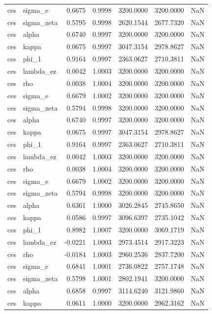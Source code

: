 \begin{tabular}{llrrrrl}
ces & sigma\_e & 0.6675 & 0.9998 & 3200.0000 & 3200.0000 & NaN \\
ces & sigma\_zeta & 0.5795 & 0.9998 & 2620.1544 & 2677.7320 & NaN \\
ces & alpha & 0.6740 & 0.9997 & 3200.0000 & 3200.0000 & NaN \\
ces & kappa & 0.0675 & 0.9997 & 3047.3154 & 2978.8627 & NaN \\
ces & phi\_1 & 0.9164 & 0.9997 & 2363.0627 & 2710.3811 & NaN \\
ces & lambda\_ez & 0.0042 & 1.0003 & 3200.0000 & 3200.0000 & NaN \\
ces & rho & 0.0038 & 1.0004 & 3200.0000 & 3200.0000 & NaN \\
ces & sigma\_e & 0.6679 & 1.0002 & 3200.0000 & 3200.0000 & NaN \\
ces & sigma\_zeta & 0.5794 & 0.9998 & 3200.0000 & 3200.0000 & NaN \\
ces & alpha & 0.6740 & 0.9997 & 3200.0000 & 3200.0000 & NaN \\
ces & kappa & 0.0675 & 0.9997 & 3047.3154 & 2978.8627 & NaN \\
ces & phi\_1 & 0.9164 & 0.9997 & 2363.0627 & 2710.3811 & NaN \\
ces & lambda\_ez & 0.0042 & 1.0003 & 3200.0000 & 3200.0000 & NaN \\
ces & rho & 0.0038 & 1.0004 & 3200.0000 & 3200.0000 & NaN \\
ces & sigma\_e & 0.6679 & 1.0002 & 3200.0000 & 3200.0000 & NaN \\
ces & sigma\_zeta & 0.5794 & 0.9998 & 3200.0000 & 3200.0000 & NaN \\
ces & alpha & 0.6361 & 1.0000 & 3026.2845 & 2745.8650 & NaN \\
ces & kappa & 0.0586 & 0.9997 & 3096.6397 & 2735.1042 & NaN \\
ces & phi\_1 & 0.8982 & 1.0007 & 3200.0000 & 3069.1719 & NaN \\
ces & lambda\_ez & -0.0221 & 1.0003 & 2973.4514 & 2917.3223 & NaN \\
ces & rho & -0.0184 & 1.0003 & 2960.2536 & 2837.7200 & NaN \\
ces & sigma\_e & 0.6841 & 1.0001 & 2736.0822 & 2757.1748 & NaN \\
ces & sigma\_zeta & 0.5798 & 1.0001 & 2802.1941 & 3200.0000 & NaN \\
ces & alpha & 0.6858 & 0.9997 & 3114.6240 & 3121.9860 & NaN \\
ces & kappa & 0.0611 & 1.0000 & 3200.0000 & 2962.3162 & NaN \\

\end{tabular}
